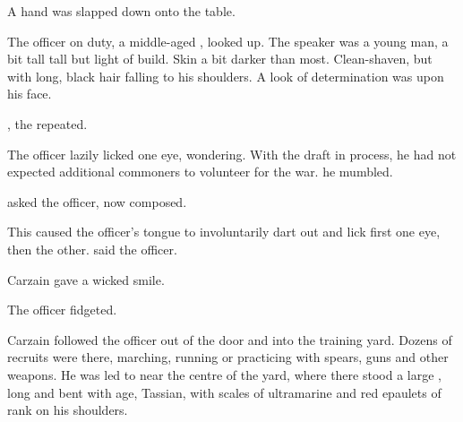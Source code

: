 \begin{comment}
\subsection{I want to fight}
\end{comment}

%
A hand was slapped down onto the table. 

The officer on duty, a middle-aged \dax, looked up. 
The speaker was a young man, a bit tall tall but light of build. 
Skin a bit darker than most. 
Clean-shaven, but with long, black hair falling to his shoulders. 
A look of determination was upon his face. 

, the \human{} repeated. 

The officer lazily licked one eye, wondering. 
With the draft in process, he had not expected additional commoners to volunteer for the war. 
 he mumbled. 


 asked the officer, now composed. 


This caused the officer's tongue to involuntarily dart out and lick first one eye, then the other. %
 said the officer. 



Carzain gave a wicked smile. 

The officer fidgeted. 

Carzain followed the officer out of the door and into the training yard. Dozens of recruits were there, marching, running or practicing with spears, guns and other weapons. He was led to near the centre of the yard, where there stood a large \dax, long and bent with age, Tassian, with scales of ultramarine and red epaulets of rank on his shoulders. 

